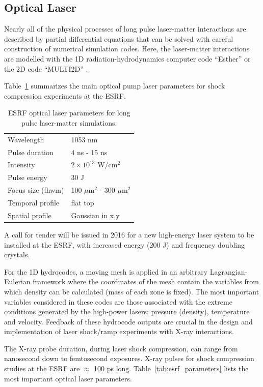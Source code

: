 \documentclass[12pt]{scrartcl}
\begin{document}
\subsection{Optical Laser}
Nearly all of the physical processes of long pulse laser-matter interactions are described by partial differential
equations that can be solved with careful construction of numerical simulation codes. Here, the laser-matter
interactions are modelled with the 1D radiation-hydrodynamics computer code ``Esther'' \cite{Colombier2005}
or the 2D code ``MULTI2D'' \cite{Ramis2009}.

Table~\ref{tab:esrf_long_pulse} summarizes the main optical pump laser
parameters for shock compression experiments at the ESRF.

\begin{table}[h]
  \centering
  \begin{tabular}{l|l}
    \hline
    \hline
Wavelength & 1053 nm \\
Pulse duration & 4 ns - 15 ns \\
Intensity & $2\times 10^{13}$ W/cm$^2$ \\
Pulse energy & 30 J \\
Focus size (fhwm) & 100 $\mu\text{m}^{2}$ - 300 $\mu\text{m}^{2}$  \\
Temporal profile  & flat top \\
Spatial profile & Gaussian in x,y \\
    \hline
    \hline
  \end{tabular}
  \caption{ESRF optical laser parameters for long pulse laser-matter
  simulations.}
  \label{tab:esrf_long_pulse}
\end{table}

A call for tender will be issued in 2016 for a new high-energy laser system to be installed at the ESRF, with increased energy (200 J) and
frequency doubling crystals.

For the 1D hydrocodes, a moving mesh is applied in an arbitrary Lagrangian-Eulerian framework where the coordinates of
the mesh contain the variables from which density can be calculated (mass of
each zone is fixed). The most important variables
considered in these codes are those associated with the extreme conditions generated by the high-power lasers: pressure (density),
temperature and velocity. Feedback of these hydrocode outputs are crucial in the design and implementation of laser shock/ramp
experiments with X-ray interactions.

The X-ray probe duration, during laser shock compression, can range from nanosecond down to femtosecond exposures.
X-ray pulses for shock compression studies at the ESRF are $\approx$ 100 ps
long. Table~\ref{tab:esrf_parameters} lists the most important optical laser
parameters.
\end{document}

